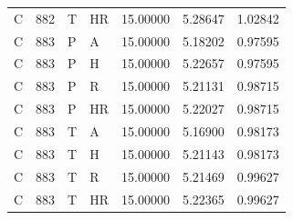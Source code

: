 \begin{longtable}{lllllll}
C & 882 & T & HR & 15.00000 & 5.28647 & 1.02842\\
C & 883 & P & A & 15.00000 & 5.18202 & 0.97595\\
C & 883 & P & H & 15.00000 & 5.22657 & 0.97595\\
C & 883 & P & R & 15.00000 & 5.21131 & 0.98715\\
C & 883 & P & HR & 15.00000 & 5.22027 & 0.98715\\
C & 883 & T & A & 15.00000 & 5.16900 & 0.98173\\
C & 883 & T & H & 15.00000 & 5.21143 & 0.98173\\
C & 883 & T & R & 15.00000 & 5.21469 & 0.99627\\
C & 883 & T & HR & 15.00000 & 5.22365 & 0.99627\\
\bottomrule
\end{longtable}
